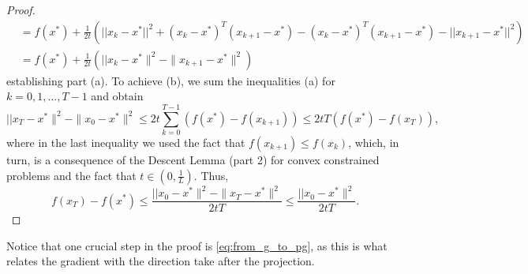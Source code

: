 \documentclass[10pt,a4paper]{article}
\begin{document}
\begin{proof}
\begin{equation*}
\begin{split}
		&= f(x^*)+\frac{1}{2t}\left(||x_k-x^*||^2+(x_k-x^*)^T(x_{k+1}-x^*)-(x_k-x^*)^T(x_{k+1}-x^*) -||x_{k+1}-x^*||^2\right)\\
		&= f(x^*)+\frac{1}{2t}\left(||x_k-x^*\|^2 -\|x_{k+1}-x^*\|^2\right)
	\end{split}
\end{equation*}
establishing part (a). To achieve (b), we sum the inequalities (a) for $k=0,1, \dots, T-1$ and obtain
\begin{equation*}
	||x_T-x^*\|^2 -\|x_0-x^*\|^2 \leq 2t \sum_{k=0}^{T-1} \left(f(x^*)-f(x_{k+1})\right) \leq 2tT(f(x^*)-f(x_T)),
\end{equation*}
where in the last inequality we used the fact that $f(x_{k+1})\leq f(x_k)$, which, in turn, is a consequence of the Descent Lemma (part 2) for convex constrained problems and the fact that $t\in(0, \frac{1}{L})$. Thus, 
\begin{equation*}
	f(x_T) -f(x^*) \leq \frac{||x_0-x^*\|^2 -\|x_T-x^*\|^2}{2tT}\leq \frac{||x_0-x^*\|^2}{2tT}.
\end{equation*}
\end{proof}

\noindent Notice that one crucial step in the proof is \eqref{eq:from_g_to_pg}, as this is what relates the gradient with the direction take after the projection.

\pagebreak
\end{document}
